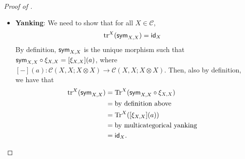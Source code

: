 \begin{proof}[Proof of ]
\begin{itemize}
\begin{align*}
     &=\text{by multicategorical strength}\\
     &=\xi_{B,D} \circ (g,\text{Tr}^{X}(f'))\\
    \end{align*}
  By definition, we also have that $g \otimes \text{tr}^{X}(f)$ is the unique morphism such that
  \[
  (g \otimes \text{tr}^{X}(f)) \circ \xi_{A,C} = \xi_{B,D} \circ (g, \text{tr}^{X}(f)),
  \]
  and $\text{tr}^{X}(f)$ is given by $\text{Tr}^{X}(f \circ \xi_{C,X}) = \text{Tr}^{X}(f')$.
  Hence, we have that
  \[
  \text{tr}^{X}(\alpha^{-1}_{B,D,X} \circ (g \otimes f) \circ \alpha_{A,C,X}) \circ \xi_{A,C} = (g \otimes \text{tr}^{X}(f)) \circ \xi_{A,C}, 
  \]
  and since precomposition with $\xi_{A,C}$ is a bijection, we have that
  \[
   \text{tr}^{X}(\alpha^{-1}_{B,D,X} \circ (g \otimes f) \circ \alpha_{A,C,X}) = g \otimes \text{tr}^{X}(f)
  \]
  \item \textbf{Yanking}: We need to show that for all $X \in \mathcal{C}$,
  \[
  \text{tr}^{X}(\textsf{sym}_{X,X}) = \textsf{id}_{X}
  \]
  By definition, $\textsf{sym}_{X,X}$ is the unique morphism such that $\textsf{sym}_{X,X} \circ \xi_{X,X} = [\xi_{X,X}](a)$, where $[-](a) : \mathcal{C}(X,X; X \otimes X) \to \mathcal{C}(X,X; X \otimes X)$.
  Then, also by definition, we have that
  \begin{align*}
    \text{tr}^{X}(\textsf{sym}_{X,X}) &= \text{Tr}^{X}(\textsf{sym}_{X,X} \circ \xi_{X,X})\\
    &=\text{by definition above}\\
    &=\text{Tr}^{X}([\xi_{X,X}](a))\\
    &=\text{by multicategorical yanking}\\
    &= \textsf{id}_{X}.
  \end{align*}
  \end{itemize}
\end{proof}

